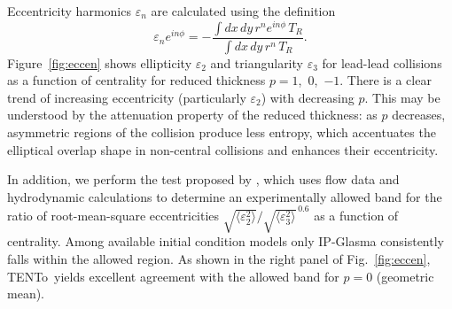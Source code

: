 \documentclass[aps,prc,reprint,amsmath,nofootinbib]{revtex4-1}
\newcommand{\trento}{T\raisebox{-.5ex}{R}ENTo}
\newcommand{\eccratio}{\sqrt{\langle \varepsilon_2^2 \rangle}/\sqrt{\langle \varepsilon_3^2 \rangle}^{\,0.6}}
\begin{document}
Eccentricity harmonics $\varepsilon_n$ are calculated using the definition
\begin{equation}
  \varepsilon_n e^{i n\phi} = -\frac{\int dx \, dy\, r^n e^{i n \phi} \, T_R}{\int dx \, dy \, r^n \, T_R}.
\end{equation}
Figure~\ref{fig:eccen} shows ellipticity $\varepsilon_2$ and triangularity $\varepsilon_3$ for lead-lead collisions as a function of centrality for reduced thickness $p = 1$,~0,~$-1$.  There is a clear trend of increasing eccentricity
(particularly $\varepsilon_2$) with decreasing $p$.  This may be understood by the attenuation property of the
reduced thickness:  as $p$ decreases, asymmetric regions of the collision produce less entropy, which
accentuates the elliptical overlap shape in non-central collisions and enhances their eccentricity.

In addition, we perform the test proposed by \cite{Retinskaya:2013gca}, which uses flow data and hydrodynamic calculations to determine an experimentally allowed band for the ratio of root-mean-square eccentricities $\eccratio$ as a function of centrality.
Among available initial condition models only IP-Glasma consistently falls within the allowed region.
As shown in the right panel of Fig.~\ref{fig:eccen}, \trento\ yields excellent agreement with the allowed band for $p = 0$ (geometric mean).
\end{document}
